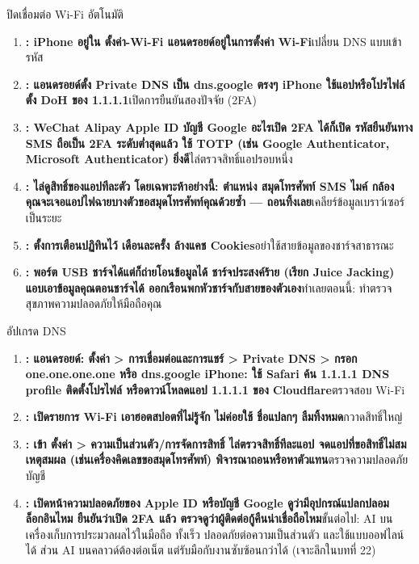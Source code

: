 
ปิดเชื่อมต่อ Wi-Fi อัตโนมัติ

\begin{enumerate}
  \item \textbf{: iPhone อยู่ใน ตั้งค่า-Wi-Fi แอนดรอยด์อยู่ในการตั้งค่า Wi-Fi}เปลี่ยน DNS แบบเข้ารหัส
  \item \textbf{: แอนดรอยด์ตั้ง Private DNS เป็น dns.google ตรงๆ iPhone ใช้แอปหรือโปรไฟล์ตั้ง DoH ของ 1.1.1.1}เปิดการยืนยันสองปัจจัย (2FA)
  \item \textbf{: WeChat Alipay Apple ID บัญชี Google อะไรเปิด 2FA ได้ก็เปิด รหัสยืนยันทาง SMS ถือเป็น 2FA ระดับต่ำสุดแล้ว ใช้ TOTP (เช่น Google Authenticator, Microsoft Authenticator) ยิ่งดี}ไล่ตรวจสิทธิ์แอปรอบหนึ่ง
  \item \textbf{: ไล่ดูสิทธิ์ของแอปทีละตัว โดยเฉพาะห้าอย่างนี้: ตำแหน่ง สมุดโทรศัพท์ SMS ไมค์ กล้อง คุณจะเจอแอปไฟฉายบางตัวขอสมุดโทรศัพท์คุณด้วยซ้ำ — ถอนทิ้งเลย}เคลียร์ข้อมูลเบราว์เซอร์เป็นระยะ
  \item \textbf{: ตั้งการเตือนปฏิทินไว้ เดือนละครั้ง ล้างแคช Cookies}อย่าใช้สายข้อมูลของชาร์จสาธารณะ
  \item \textbf{: พอร์ต USB ชาร์จได้แต่ก็ถ่ายโอนข้อมูลได้ ชาร์จประสงค์ร้าย (เรียก Juice Jacking) แอบเอาข้อมูลคุณตอนชาร์จได้ ออกเรือนพกหัวชาร์จกับสายของตัวเอง}ทำเลยตอนนี้: ทำตรวจสุขภาพความปลอดภัยให้มือถือคุณ
\end{enumerate}

\begin{tcbpractice}{อัปเกรด DNS}
\begin{enumerate}
  \item \textbf{: แอนดรอยด์: ตั้งค่า > การเชื่อมต่อและการแชร์ > Private DNS > กรอก one.one.one.one หรือ dns.google iPhone: ใช้ Safari ค้น 1.1.1.1 DNS profile ติดตั้งโปรไฟล์ หรือดาวน์โหลดแอป 1.1.1.1 ของ Cloudflare}ตรวจสอบ Wi-Fi
  \item \textbf{: เปิดรายการ Wi-Fi เอาฮอตสปอตที่ไม่รู้จัก ไม่ค่อยใช้ ชื่อแปลกๆ ลืมทิ้งหมด}กวาดสิทธิ์ใหญ่
  \item \textbf{: เข้า ตั้งค่า > ความเป็นส่วนตัว/การจัดการสิทธิ์ ไล่ตรวจสิทธิ์ทีละแอป จดแอปที่ขอสิทธิ์ไม่สมเหตุสมผล (เช่นเครื่องคิดเลขขอสมุดโทรศัพท์) พิจารณาถอนหรือหาตัวแทน}ตรวจความปลอดภัยบัญชี
  \item \textbf{: เปิดหน้าความปลอดภัยของ Apple ID หรือบัญชี Google ดูว่ามีอุปกรณ์แปลกปลอมล็อกอินไหม ยืนยันว่าเปิด 2FA แล้ว ตรวจดูว่าผู้ติดต่อกู้คืนน่าเชื่อถือไหม}ขั้นต่อไป: AI บนเครื่องเก็บการประมวลผลไว้ในมือถือ ทั้งเร็ว ปลอดภัยต่อความเป็นส่วนตัว และใช้แบบออฟไลน์ได้ ส่วน AI บนคลาวด์ต้องต่อเน็ต แต่รับมือกับงานซับซ้อนกว่าได้ (เจาะลึกในบทที่ 22)
\end{enumerate}

\end{tcbpractice}
